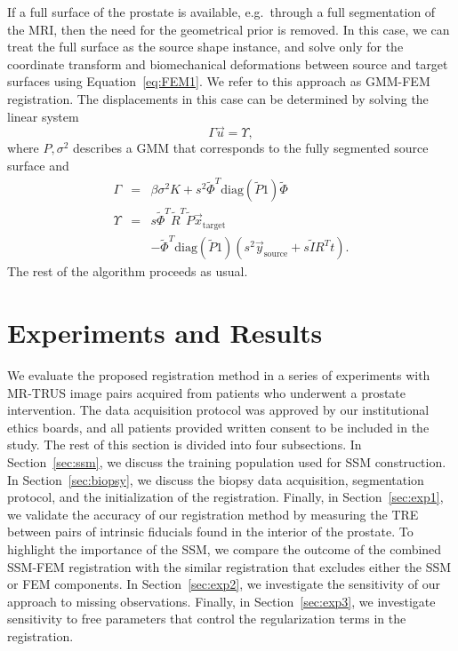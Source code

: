 \documentclass[journal]{IEEEtran}
\newcommand{\trans}[1]{#1^{\scriptscriptstyle T}}
\newcommand{\diag}{\mathrm{diag}}
\begin{document}
If a full surface of the prostate is available, e.g.~through a full segmentation of the MRI, then the need for the geometrical prior is removed. In this case, we can treat the full surface as the source shape instance, and solve only for the coordinate transform and biomechanical deformations between source and target surfaces using Equation~\eqref{eq:FEM1}. We refer to this approach as GMM-FEM registration.  The displacements in this case can be determined by solving the linear system
\begin{equation} \label{eq:GMMFEM1}
\Gamma\vec{u} = \Upsilon,
\end{equation}
where $P,\sigma^2$ describes a GMM that corresponds to the fully segmented source surface and
\begin{eqnarray} \label{eq:GMMFEM2}
 \Gamma &=& \beta \sigma^2K + s^2\trans{\tilde{\Phi}}\diag(\tilde{P}1)\tilde{\Phi}\\
 \Upsilon &=& s\trans{\tilde{\Phi}}\trans{\tilde{R}}\tilde{P}\vec{x}_\mathrm{target}\nonumber\\
 && -\trans{\tilde{\Phi}}\diag(\tilde{P}1)\left(s^2\vec{y}_\mathrm{source}+s\tilde{I}\trans{R}t\right)\nonumber.
\end{eqnarray}
The rest of the algorithm proceeds as usual.

\section{Experiments and Results}
We evaluate the proposed registration method in a series of experiments with MR-TRUS image pairs acquired from patients who underwent a prostate intervention. The data acquisition protocol was approved by our institutional ethics boards, and all patients provided written consent to be included in the study. The rest of this section is divided into four subsections. In Section~\ref{sec:ssm}, we discuss the training population used for SSM construction. In Section~\ref{sec:biopsy}, we discuss the biopsy data acquisition, segmentation protocol, and the initialization of the registration. Finally, in Section~\ref{sec:exp1}, we validate the accuracy of our registration method by measuring the TRE between pairs of intrinsic fiducials found in the interior of the prostate. To highlight the importance of the SSM, we compare the outcome of the combined SSM-FEM registration with the similar registration that excludes either the SSM or FEM components. In Section~\ref{sec:exp2}, we investigate the sensitivity of our approach to missing observations. Finally, in Section~\ref{sec:exp3}, we investigate sensitivity to free parameters that control the regularization terms in the registration.
\end{document}
